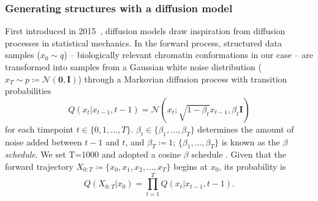 \documentclass[12pt,letterpaper]{article}
\begin{document}

\subsubsection*{Generating structures with a diffusion model}
\label{subsec:AI:Theory}

First introduced in 2015~\cite{Sohl-Dickstein2015}, diffusion models draw inspiration from diffusion processes in statistical mechanics. In the forward process, structured data samples ($x_0\sim q$) -- biologically relevant chromatin conformations in our case -- are transformed into samples from a Gaussian white noise distribution ($x_T\sim p\coloneq\mathcal{N}(\boldsymbol{0},\boldsymbol{I})$) through a Markovian diffusion process with transition probabilities~\cite{Ho2020}
    $$Q(x_{t}\vert x_{t-1},t-1) = \mathcal{N}(x_t; \sqrt{1-\beta_t}x_{t-1},\beta_t\boldsymbol{I})$$
for each timepoint $t\in\lbrace 0,1,...,T \rbrace$. $\beta_t\in\lbrace \beta_1,\ldots,\beta_{T} \rbrace$ determines the amount of noise added between $t-1$ and $t$, and $\beta_{T}\coloneq 1$; $\lbrace \beta_1,\ldots,\beta_{T} \rbrace$ is known as the \textit{$\beta$ schedule}. We set T=1000 and adopted a cosine $\beta$ schedule \cite{nichol_improved_2021}. Given that the forward trajectory $X_{0:T}\coloneq\{x_0,x_1,x_2,...,x_T\}$ begins at $x_0$, its probability is 
$$Q(X_{0:T}|x_0) = \prod_{t=1}^{T} Q(x_{t}\vert x_{t-1},t-1).$$  
\end{document}
